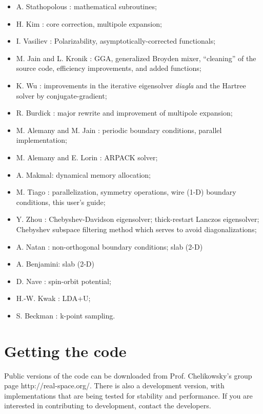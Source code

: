 \documentclass{article}
\begin{document}
\begin{itemize}
\item A. Stathopolous : mathematical subroutines;
\item H. Kim : core correction, multipole expansion;
\item I. Vasiliev : Polarizability, asymptotically-corrected functionals;
\item M. Jain and L. Kronik : GGA, generalized Broyden mixer,
  ``cleaning'' of the source code, efficiency improvements, and added functions;
\item K. Wu : improvements in the iterative eigensolver {\em diagla} 
      and the Hartree solver by conjugate-gradient;
\item R. Burdick : major rewrite and improvement of multipole expansion;
\item M. Alemany and M. Jain : periodic boundary conditions, parallel
implementation;
\item M. Alemany and E. Lorin : ARPACK solver;
\item A. Makmal: dynamical memory allocation;
\item M. Tiago : parallelization, symmetry operations, wire (1-D)
  boundary conditions, this user's guide;
\item Y. Zhou : Chebyshev-Davidson eigensolver; 
thick-restart Lanczos eigensolver; Chebyshev subspace
filtering method which serves to avoid diagonalizations;
\item A. Natan : non-orthogonal boundary conditions; slab (2-D)
\item A. Benjamini: slab (2-D)
\item D. Nave : spin-orbit potential;
\item H.-W. Kwak : LDA+U;
\item S. Beckman : k-point sampling.
\end{itemize}







\section{Getting the code}

Public versions of the code can be downloaded from
{Prof. Chelikowsky's group page} 
{http://real-space.org/}. There is also a development
version, with implementations that are being tested for stability and
performance. If you are interested in contributing to development,
contact the developers.
\end{document}
